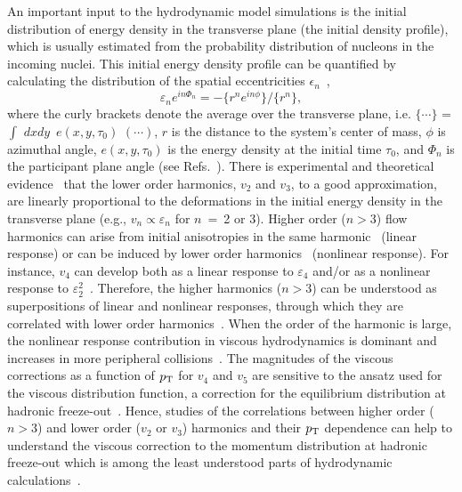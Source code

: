An important input to the hydrodynamic model simulations is the initial distribution of energy density in the transverse plane (the initial density profile), which is usually estimated from the probability distribution of nucleons in the incoming nuclei.
This initial energy density profile can be quantified by calculating the distribution of the spatial eccentricities $\epsilon_n$~\cite{Alver:2010gr},
\begin{equation}
 \varepsilon_{n} e^{in\Phi_{n}} = -\{r^n e^{in\phi}\}/ \{r^n\},
  \label{eq:eccentricities}
\end{equation}
where the curly brackets denote the average over the transverse plane, i.e. $\{\cdots\}$ = $\int$ $d$$x$$d$$y$\, $e(x,y,\tau_0)$ $(\cdots)$, $r$ is the distance to the system's center of mass, $\phi$ is azimuthal angle, $e(x,y,\tau_0)$ is the energy density at the initial time $\tau_0$, and $\Phi_{n}$ is the participant plane angle (see Refs.~\cite{Teaney:2010vd,Niemi:2015qia}).
There is experimental and theoretical evidence~\cite{Alver:2010gr,Qiu:2011iv,ALICE:2011ab} that the lower order harmonics, $v_2$ and $v_3$, to a good approximation, are linearly proportional to the deformations in the initial energy density in the transverse plane (e.g., $v_n \propto \varepsilon_n$ for $n~=~$2 or 3).
Higher order ($n > 3$) flow harmonics can arise from initial anisotropies in the same harmonic~\cite{Alver:2010gr,Teaney:2010vd,Gubser:2010ui,Hatta:2014jva} (linear response) or can be induced by lower order harmonics~\cite{Bravina:2013xla,Bravina:2013ora} (nonlinear response).
For instance, $v_4$ can develop both as a linear response to $\varepsilon_4$ and/or as a nonlinear response to $\varepsilon_2^2$~\cite{Gardim:2011xv}.
Therefore, the higher harmonics ($n > 3$) can be understood as superpositions of linear and nonlinear responses, through which they are correlated with lower order harmonics~\cite{Teaney:2012ke,Bravina:2013ora,Gubser:2010ui,Hatta:2014jva,Acharya:2017zfg}. When the order of the harmonic is large, the nonlinear response contribution in viscous hydrodynamics is dominant and increases in more peripheral collisions~\cite{Teaney:2012ke,Bravina:2013ora}.
The magnitudes of the viscous corrections as a function of $p_{\rm T}$ for $v_4$ and $v_5$ are sensitive to the ansatz used for the viscous distribution function, a correction for the equilibrium distribution at hadronic freeze-out~\cite{Luzum:2010ad,Teaney:2012ke}.
Hence, studies of the correlations between higher order ($n>3$) and lower order ($v_2$ or $v_3$) harmonics and their $p_{\rm T}$ dependence can help to understand the viscous correction to the momentum distribution at hadronic freeze-out which is among the least understood parts of hydrodynamic calculations~\cite{Dusling:2009df,Teaney:2012ke,Molnar:2014fva,Niemi:2015qia}.

